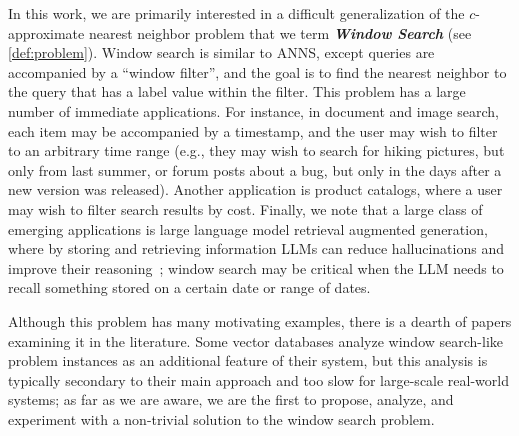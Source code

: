 \documentclass{article}
\theoremstyle{plain}
\theoremstyle{definition}
\theoremstyle{remark}
\newcommand{\shangdi}[1]{{\color{blue}{\bf Shangdi:} #1}}
\newcommand{\josh}[1]{{\color{orange}{\bf Josh:} #1}}
\newcommand{\emp}[1]{{\textbf{\textit{#1}}}}
\newcommand{\algname}[1]{\ensuremath{\mathsf{#1}}}
\begin{document}
In this work, we are primarily interested in a difficult generalization of the $c$-approximate nearest neighbor problem that we term \emp{Window Search} (see \cref{def:problem}). 
Window search is similar to ANNS, except queries are accompanied by a ``window filter'', and the goal is to find the nearest neighbor to the query that has a label value within the filter. 
This problem has a large number of immediate applications. For instance, in document and image search, each item may be accompanied by a timestamp, and the user may wish to filter to an arbitrary time range (e.g., they may wish to search for hiking pictures, but only from last summer, or forum posts about a bug, but only in the days after a new version was released). Another application is product catalogs, where a user may wish to filter search results by cost. Finally, we note that a large class of emerging applications is large language model retrieval augmented generation, where by storing and retrieving information LLMs can reduce hallucinations and improve their reasoning~\cite{peng2023check}; 
window search may be critical when the LLM needs to recall something stored on a certain date or range of dates. 

Although this problem has many motivating examples, there is a dearth of papers examining it in the literature. 
Some vector databases analyze window search-like problem instances as an additional feature of their system, but this analysis is typically secondary to their main approach and too slow for large-scale real-world systems; as far as we are aware, we are the first to propose, analyze, and experiment with a non-trivial solution to the window search problem. 

\end{document}
